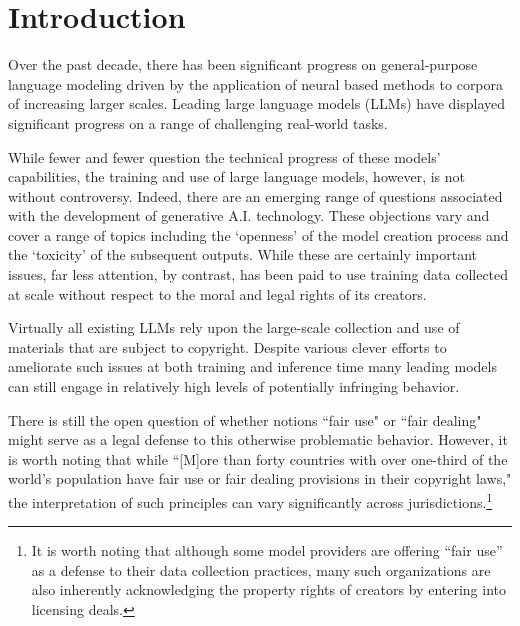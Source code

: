 \section{Introduction}
Over the past decade, there has been significant progress on general-purpose language modeling driven by the application of neural based methods \cite{rumelhart1986learning}\cite{hopfield1982neural} to corpora of increasing larger scales.\cite{brown2020language}\cite{dubey2024llama}\cite{guo2025deepseek}  Leading large language models (LLMs) have displayed significant progress on a range of challenging real-world tasks.\cite{goh2025gpt}\cite{dell2023navigating}\cite{katz2024gpt}\cite{brin2023comparing}

While fewer and fewer question the technical progress of these models' capabilities, the training and use of large language models, however, is not without controversy.   Indeed, there are an emerging range of questions associated with the development of generative A.I. technology.  These objections vary and cover a range of topics including the `openness' of the model creation process and the `toxicity' of the subsequent outputs.\cite{liesenfeld2024rethinking}\cite{longpre2024pretrainer}\cite{bommasani2024foundation}  While these are certainly important issues, far less attention, by contrast, has been paid to use training data collected at scale without respect to the moral and legal rights of its creators.  

Virtually all existing LLMs rely upon the large-scale collection and use of materials that are subject to copyright. Despite various clever efforts to ameliorate such issues at both training \cite{minsilo2024} and inference time \cite{golatkar2024cpr}\cite{ippolito2023preventing}\cite{flemings2024differentially} many leading models can still engage in relatively high levels of potentially infringing behavior.\cite{chen2024copybench}     

There is still the open question of whether notions ``fair use" or ``fair dealing" might serve as a legal defense to this otherwise problematic behavior.\cite{henderson2023foundation}\cite{sag2024fairness}  However, it is worth noting that while ``[M]ore than forty countries with over one-third of the world’s population have fair use or fair dealing provisions in their copyright laws,"\cite{band2013fair} the interpretation of such principles can vary significantly across jurisdictions.\footnote{It is worth noting that although some model providers are offering ``fair use'' as a defense to their data collection practices, many such organizations are also inherently acknowledging the property rights of creators by entering into licensing deals.} 

